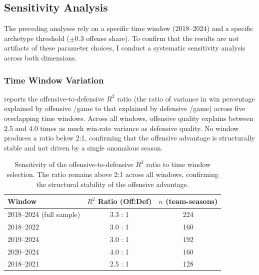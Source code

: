 \subsection{Sensitivity Analysis}
\label{sec:sensitivity-analysis}

The preceding analyses rely on a specific time window (2018--2024) and a
specific archetype threshold ($\pm 0.3$ offense share). To confirm that the
results are not artifacts of these parameter choices, I conduct a systematic
sensitivity analysis across both dimensions.

\subsubsection*{Time Window Variation}

 reports the offensive-to-defensive $R^2$ ratio
(the ratio of variance in win percentage explained by offensive \xvoa{}/game
to that explained by defensive \xvoa{}/game) across five overlapping time
windows. Across all windows, offensive quality explains between 2.5 and 4.0
times as much win-rate variance as defensive quality. No window produces a
ratio below 2:1, confirming that the offensive advantage is structurally
stable and not driven by a single anomalous season.

\begin{table}[htbp]
  \centering
  \caption{Sensitivity of the offensive-to-defensive $R^2$ ratio to time
           window selection. The ratio remains above 2:1 across all windows,
           confirming the structural stability of the offensive advantage.}
  \label{tab:sensitivity-time}
  \begin{tabular}{lcc}
    \toprule
    \textbf{Window} & \textbf{$R^2$ Ratio (Off:Def)} & \textbf{$n$ (team-seasons)} \\
    \midrule
    2018--2024 (full sample)  & 3.3 : 1 & 224 \\
    2018--2022               & 3.0 : 1 & 160 \\
    2019--2024               & 3.0 : 1 & 192 \\
    2020--2024               & 4.0 : 1 & 160 \\
    2018--2021               & 2.5 : 1 & 128 \\
    \bottomrule
  \end{tabular}
\end{table}

